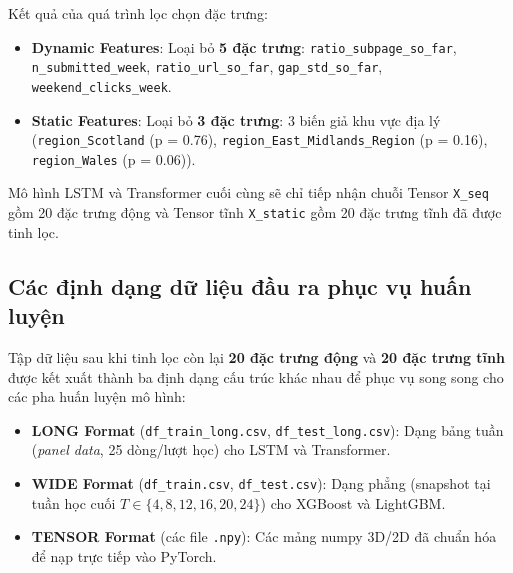 Kết quả của quá trình lọc chọn đặc trưng:
\begin{itemize}[noitemsep,topsep=0pt]
    \item \textbf{Dynamic Features}: Loại bỏ \textbf{5 đặc trưng}: \texttt{ratio\_}\allowbreak\texttt{subpage\_}\allowbreak\texttt{so\_}\allowbreak\texttt{far}, \texttt{n\_}\allowbreak\texttt{submitted\_}\allowbreak\texttt{week}, \texttt{ratio\_}\allowbreak\texttt{url\_}\allowbreak\texttt{so\_}\allowbreak\texttt{far}, \texttt{gap\_}\allowbreak\texttt{std\_}\allowbreak\texttt{so\_}\allowbreak\texttt{far}, \texttt{weekend\_}\allowbreak\texttt{clicks\_}\allowbreak\texttt{week}.    
    \item \textbf{Static Features}: Loại bỏ \textbf{3 đặc trưng}: 3 biến giả khu vực địa lý (\texttt{region\_Scotland} (p = 0.76), \texttt{region\_East\_Midlands\_Region} (p = 0.16), \texttt{region\_Wales} (p = 0.06)).
\end{itemize}
Mô hình LSTM và Transformer cuối cùng sẽ chỉ tiếp nhận chuỗi Tensor \texttt{X\_seq} gồm 20 đặc trưng động và Tensor tĩnh \texttt{X\_static} gồm 20 đặc trưng tĩnh đã được tinh lọc.

\subsection{Các định dạng dữ liệu đầu ra phục vụ huấn luyện}

Tập dữ liệu sau khi tinh lọc còn lại \textbf{20 đặc trưng động} và \textbf{20 đặc trưng tĩnh} được kết xuất thành ba định dạng cấu trúc khác nhau để phục vụ song song cho các pha huấn luyện mô hình:
\begin{itemize}[noitemsep,topsep=0pt]
    \item \textbf{LONG Format} (\texttt{df\_train\_long.csv}, \texttt{df\_test\_long.csv}): Dạng bảng tuần (\textit{panel data}, 25 dòng/lượt học) cho LSTM và Transformer.
    \item \textbf{WIDE Format} (\texttt{df\_train.csv}, \texttt{df\_test.csv}): Dạng phẳng (snapshot tại tuần học cuối $T \in \{4, 8, 12, 16, 20, 24\}$) cho XGBoost và LightGBM.
    \item \textbf{TENSOR Format} (các file \texttt{.npy}): Các mảng numpy 3D/2D đã chuẩn hóa để nạp trực tiếp vào PyTorch.
\end{itemize}

\endgroup